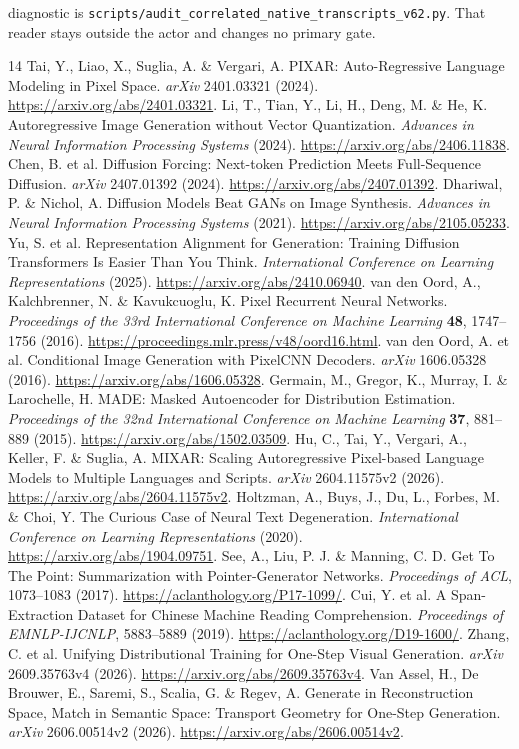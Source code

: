 \documentclass[10pt,a4paper]{article}
\begin{document}
diagnostic is \texttt{scripts/audit\_correlated\_native\_transcripts\_v62.py}.
That reader stays outside the actor and changes no primary gate.
\begin{thebibliography}{14}
 Tai, Y., Liao, X., Suglia, A. \& Vergari, A. PIXAR: Auto-Regressive Language Modeling in Pixel Space. \emph{arXiv} 2401.03321 (2024). \url{https://arxiv.org/abs/2401.03321}.
 Li, T., Tian, Y., Li, H., Deng, M. \& He, K. Autoregressive Image Generation without Vector Quantization. \emph{Advances in Neural Information Processing Systems} (2024). \url{https://arxiv.org/abs/2406.11838}.
 Chen, B. et al. Diffusion Forcing: Next-token Prediction Meets Full-Sequence Diffusion. \emph{arXiv} 2407.01392 (2024). \url{https://arxiv.org/abs/2407.01392}.
 Dhariwal, P. \& Nichol, A. Diffusion Models Beat GANs on Image Synthesis. \emph{Advances in Neural Information Processing Systems} (2021). \url{https://arxiv.org/abs/2105.05233}.
 Yu, S. et al. Representation Alignment for Generation: Training Diffusion Transformers Is Easier Than You Think. \emph{International Conference on Learning Representations} (2025). \url{https://arxiv.org/abs/2410.06940}.
 van den Oord, A., Kalchbrenner, N. \& Kavukcuoglu, K. Pixel Recurrent Neural Networks. \emph{Proceedings of the 33rd International Conference on Machine Learning} \textbf{48}, 1747--1756 (2016). \url{https://proceedings.mlr.press/v48/oord16.html}.
 van den Oord, A. et al. Conditional Image Generation with PixelCNN Decoders. \emph{arXiv} 1606.05328 (2016). \url{https://arxiv.org/abs/1606.05328}.
 Germain, M., Gregor, K., Murray, I. \& Larochelle, H. MADE: Masked Autoencoder for Distribution Estimation. \emph{Proceedings of the 32nd International Conference on Machine Learning} \textbf{37}, 881--889 (2015). \url{https://arxiv.org/abs/1502.03509}.
 Hu, C., Tai, Y., Vergari, A., Keller, F. \& Suglia, A. MIXAR: Scaling Autoregressive Pixel-based Language Models to Multiple Languages and Scripts. \emph{arXiv} 2604.11575v2 (2026). \url{https://arxiv.org/abs/2604.11575v2}.
 Holtzman, A., Buys, J., Du, L., Forbes, M. \& Choi, Y. The Curious Case of Neural Text Degeneration. \emph{International Conference on Learning Representations} (2020). \url{https://arxiv.org/abs/1904.09751}.
 See, A., Liu, P. J. \& Manning, C. D. Get To The Point: Summarization with Pointer-Generator Networks. \emph{Proceedings of ACL}, 1073--1083 (2017). \url{https://aclanthology.org/P17-1099/}.
 Cui, Y. et al. A Span-Extraction Dataset for Chinese Machine Reading Comprehension. \emph{Proceedings of EMNLP-IJCNLP}, 5883--5889 (2019). \url{https://aclanthology.org/D19-1600/}.
 Zhang, C. et al. Unifying Distributional Training for One-Step Visual Generation. \emph{arXiv} 2609.35763v4 (2026). \url{https://arxiv.org/abs/2609.35763v4}.
 Van Assel, H., De Brouwer, E., Saremi, S., Scalia, G. \& Regev, A. Generate in Reconstruction Space, Match in Semantic Space: Transport Geometry for One-Step Generation. \emph{arXiv} 2606.00514v2 (2026). \url{https://arxiv.org/abs/2606.00514v2}.
\end{thebibliography}
\end{document}
